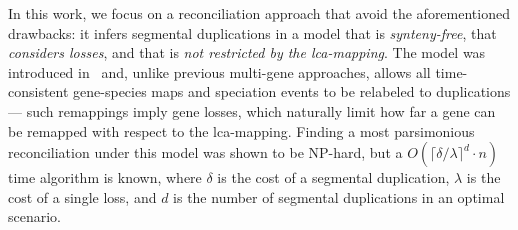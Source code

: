 \documentclass[10pt]{article}
\newcommand{\rk}[1]{\begingroup\color{red}#1\endgroup}
\begin{document}

In this work, we focus on a reconciliation approach that avoid the aforementioned drawbacks: it infers segmental duplications in a model that is \emph{synteny-free}, that \emph{considers losses}, and that is \emph{not restricted by the lca-mapping}.
The model was introduced in~\cite{dondi2019reconciling}
and, unlike previous multi-gene approaches, allows all time-consistent gene-species maps and speciation events to be relabeled to duplications --- such remappings imply gene losses, which naturally limit how far a gene can be remapped with respect to the lca-mapping.
Finding a most parsimonious reconciliation under this model was shown to be NP-hard, but a $O(\lceil \delta/\lambda \rceil^d \cdot n)$ time algorithm is known, where $\delta$ is the cost of a segmental duplication, $\lambda$ is the cost of a single loss, and $d$ is the number of segmental duplications in an optimal scenario. 
\end{document}
